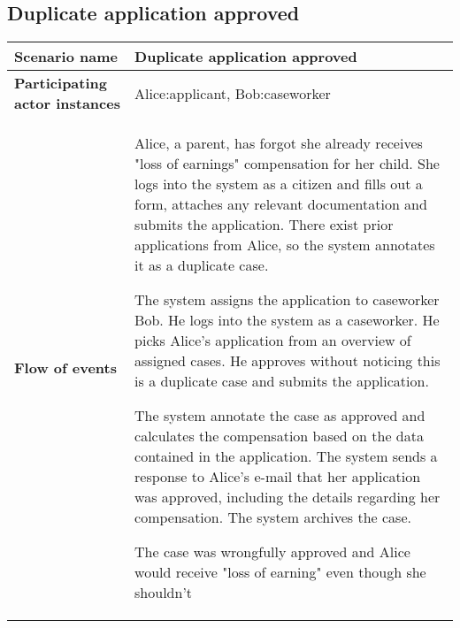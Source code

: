 \subsection*{Duplicate application approved}
\begin{table}[htb!]
\begin{tabularx}{\textwidth}{l|X}
	\textbf{Scenario name} &  Duplicate application approved\\
	\hline
	\textbf{Participating actor instances} & Alice:applicant, Bob:caseworker\\
	\hline
	\textbf{Flow of events} &
    \begin{compactenum}
	        \item Alice, a parent, has forgot she already receives "loss of earnings" compensation for her child. She logs into the system as a citizen and fills out a form, attaches any relevant documentation and submits the application. There exist prior applications from Alice, so the system annotates it as a duplicate case.
	        \item The system assigns the application to caseworker Bob. He logs into the system as a caseworker. He picks Alice's application from an overview of assigned cases. He approves without noticing this is a duplicate case and submits the application.
	        \item The system annotate the case as approved and calculates the compensation based on the data contained in the application. The system sends a response to Alice's e-mail that her application was approved, including the details regarding her compensation. The system archives the case.
	        \item The case was wrongfully approved and Alice would receive "loss of earning" even though she shouldn't
    \end{compactenum}\\
	\hline
\end{tabularx}
\end{table}

